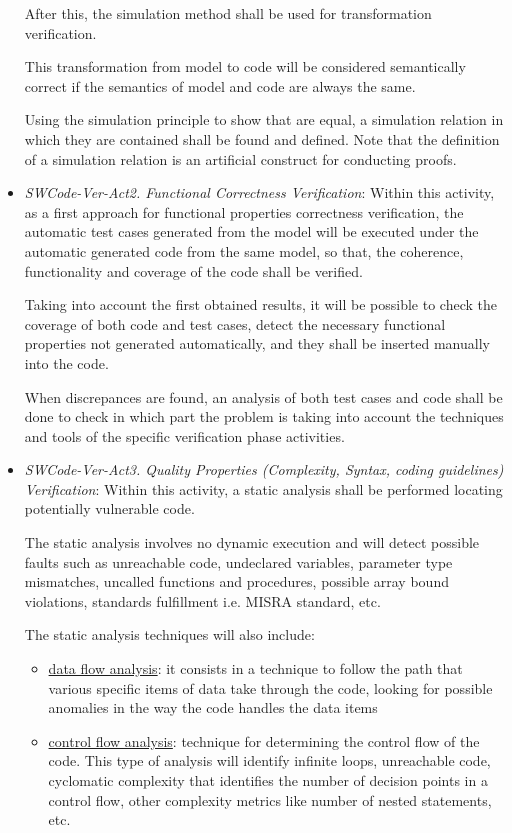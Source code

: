 \documentclass{template/openetcs_report}
\begin{document}
\begin{itemize}
After this, the simulation method shall be used for transformation verification. 

This transformation from model to code will be considered semantically
correct if the semantics of model and code are always the same.

Using the simulation principle to show that are equal, a simulation relation in which they are contained shall be found and defined. Note that
the definition of a simulation relation is an artificial construct for conducting proofs.


\item {\it SWCode-Ver-Act2.  Functional Correctness Verification}: Within this activity, as a first approach for functional properties correctness verification, the automatic test cases generated from the model will be executed under the automatic generated code from the same model, so that, the coherence, functionality and coverage of the code shall be verified. 

Taking into account the first obtained results, it will be possible to check the coverage of both code and test cases, detect the necessary functional properties not generated automatically, and they shall be inserted manually into the code.

When discrepances are found, an analysis of both test cases and code shall be done to check in which part the problem is taking into account the techniques and tools of the specific verification phase activities. 


\item {\it SWCode-Ver-Act3. Quality Properties (Complexity, Syntax, coding guidelines) Verification}: Within this activity, a static analysis shall be performed locating potentially vulnerable code.

The static analysis involves no dynamic execution and will detect possible faults such as unreachable code, undeclared variables, parameter type mismatches, uncalled functions and procedures, possible array bound violations, standards fulfillment i.e. MISRA standard, etc. 

The static analysis techniques will also include:
\begin{itemize}
\item \underline{data flow analysis}: it consists in a technique to follow the path that various specific items of data take through the code, looking for possible anomalies in the way the code handles the data items
\item \underline{control flow analysis}: technique for determining the control flow of the code. This type of analysis will identify infinite loops, unreachable code, cyclomatic complexity that identifies the number of decision points in a control flow, other complexity metrics like number of nested statements, etc.
\end{itemize}


\end{itemize}
\end{document}
